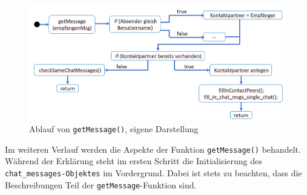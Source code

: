 \documentclass[a4paper,titlepage,halfparskip,12pt]{scrreprt}
\begin{document}
\begin{onehalfspacing}
\begin{figure}[h]
	\centering
	\includegraphics[scale=0.5]{images/getMessageAblauf}
	\caption{Ablauf von \texttt{getMessage()}, eigene Darstellung}
	\label{img:getMessageAblauf}
\end{figure}
Im weiteren Verlauf werden die Aspekte der Funktion \texttt{getMessage()} behandelt. Während der Erklärung steht im ersten Schritt die Initialisierung des \texttt{chat\_messages-Objektes} im Vordergrund. Dabei ist stets zu beachten, dass die Beschreibungen Teil der \texttt{getMessage}-Funktion sind.


\end{onehalfspacing}
\end{document}
